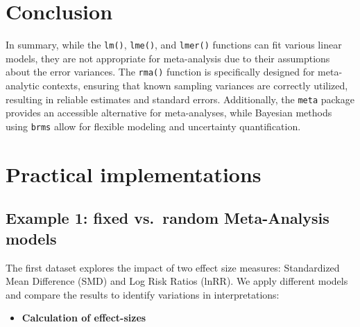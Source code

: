 \documentclass[
]{book}
\providecommand{\tightlist}{%
  \setlength{\itemsep}{0pt}\setlength{\parskip}{0pt}}
\begin{document}
\section{Conclusion}\label{conclusion}

In summary, while the \texttt{lm()}, \texttt{lme()}, and \texttt{lmer()} functions can fit various linear models, they are not appropriate for meta-analysis due to their assumptions about the error variances. The \texttt{rma()} function is specifically designed for meta-analytic contexts, ensuring that known sampling variances are correctly utilized, resulting in reliable estimates and standard errors. Additionally, the \texttt{meta} package provides an accessible alternative for meta-analyses, while Bayesian methods using \texttt{brms} allow for flexible modeling and uncertainty quantification.

\section{Practical implementations}\label{practical-implementations}

\subsection{Example 1: fixed vs.~random Meta-Analysis models}\label{example-1-fixed-vs.-random-meta-analysis-models}

\hfill\break
The first dataset explores the impact of two effect size measures: Standardized Mean Difference (SMD) and Log Risk Ratios (lnRR). We apply different models and compare the results to identify variations in interpretations:

\begin{itemize}
\tightlist
\item
  \textbf{Calculation of effect-sizes}
\end{itemize}
\end{document}
